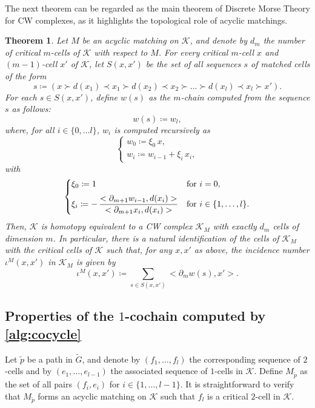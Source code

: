 \documentclass[a4paper,twoside,10pt]{article}
\theoremstyle{plain}
\newtheorem{theorem}{Theorem}[section]
\theoremstyle{definition}
\theoremstyle{remark}
\newcommand{\mc}{\mathcal}
\newcommand{\K}{\mc{K}}
\newcommand{\inner}[2]{< #1,#2>}
\newcommand{\dual}[1]{\tilde{#1}}
\begin{document}
The next theorem can be regarded as the main theorem of Discrete Morse Theory for CW complexes, as it highlights the topological role of acyclic matchings.
\begin{theorem}\textup{\cite[Theorem 11.13 (b) and (c)]{Kozlov2008}}
\label{thm:main}
Let $M$ be an acyclic matching on $\K$, and denote by $d_m$ the number of critical $m$-cells of $\K$ with respect to $M$.
For every critical $m$-cell $x$ and $(m-1)$-cell $x'$ of $\K$, let $S(x,x')$ be the set of all sequences $s$ of matched cells of the form
\begin{equation*}
s \coloneqq (x \succ d(x_1) \prec x_1 \succ d(x_2) \prec x_2 \succ \dots \succ d(x_l) \prec x_l \succ x').
\end{equation*}
For each $s \in S(x,x')$, define $w(s)$ as the $m$-chain computed from the sequence $s$ as follows:
$$w(s) \coloneqq w_l,$$
where, for all $i \in \{0, \dots l\}$, $w_i$ is computed recursively as
\begin{equation}
\begin{cases}
w_0\coloneqq \xi_0\,x,\\
w_i \coloneqq w_{i-1} + \xi_{i}\, x_{i},
\end{cases}
\label{eq:recursion}
\end{equation}
with 
\begin{equation}
\begin{dcases}
\xi_0 \coloneqq 1 & \text{for } i = 0, \\[2pt]
\xi_i \coloneqq -\,\dfrac{\inner{\partial_{m+1} w_{i-1}}{d(x_i)}}{\inner{\partial_{m+1} x_i}{d(x_i)}} & \text{for } i \in \{1, \dots, l\}.
\end{dcases}
\label{eq:coefficient}
\end{equation}
Then, $\K$ is homotopy equivalent to a CW complex $\K_M$ with exactly $d_m$ cells of dimension $m$.
In particular, there is a natural identification of the cells of $\K_M$ with the critical cells of $\K$ such that, for any $x,x'$ as above, the incidence number $\iota^M(x,x')$ in $\K_M$ is given by
\begin{equation}
\iota^M(x,x') \coloneqq \sum_{s \in S(x,x')} \inner{\partial_m w(s)}{x'}.
\label{eq:morse.formula}
\end{equation}
\end{theorem}


\subsection{Properties of the $1$-cochain computed by \cref{alg:cocycle}}
Let $\dual{p}$ be a path in $\dual{G}$, and denote by $(f_1, \dots, f_l)$ the corresponding sequence of $2$-cells and by $(e_1, \dots, e_{l-1})$ the associated sequence of $1$-cells in $\mc{K}$.
Define $M_{\dual{p}}$ as the set of all pairs $(f_i, e_i)$ for $i \in \{1, \dots, l-1\}$.
It is straightforward to verify that $M_{\dual{p}}$ forms an acyclic matching on $\mc{K}$ such that $f_l$ is a critical $2$-cell in $\K$.
\end{document}

